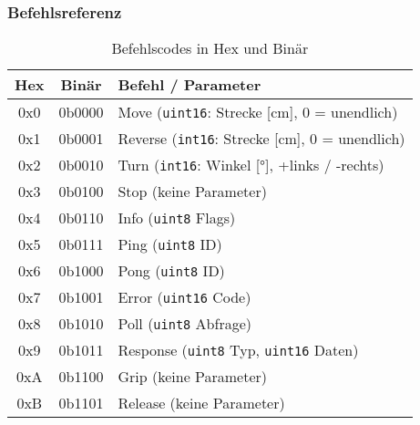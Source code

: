 \documentclass[main.tex]{subfiles} %
\begin{document}
\subsubsection*{Befehlsreferenz}
\begin{table}[h!]
  \centering
  \begin{tabular}{>{\ttfamily}c >{\ttfamily}c l}
    \toprule
    \textnormal{Hex} & \textnormal{Binär} & \textnormal{Befehl / Parameter}                       \\
    \midrule
    0x0              & 0b0000             & Move (\texttt{uint16}: Strecke [cm], 0 = unendlich)   \\
    0x1              & 0b0001             & Reverse (\texttt{int16}: Strecke [cm], 0 = unendlich) \\
    0x2              & 0b0010             & Turn (\texttt{int16}: Winkel [°], +links / -rechts)   \\
    0x3              & 0b0100             & Stop (keine Parameter)                                \\
    0x4              & 0b0110             & Info (\texttt{uint8} Flags)                           \\
    0x5              & 0b0111             & Ping (\texttt{uint8} ID)                              \\
    0x6              & 0b1000             & Pong (\texttt{uint8} ID)                              \\
    0x7              & 0b1001             & Error (\texttt{uint16} Code)                          \\
    0x8              & 0b1010             & Poll (\texttt{uint8} Abfrage)                         \\
    0x9              & 0b1011             & Response (\texttt{uint8} Typ, \texttt{uint16} Daten)  \\
    0xA              & 0b1100             & Grip (keine Parameter)                                \\
    0xB              & 0b1101             & Release (keine Parameter)                             \\
    \bottomrule
  \end{tabular}
  \caption{Befehlscodes in Hex und Binär}
  \label{tab:cmds}
\end{table}

\end{document}
